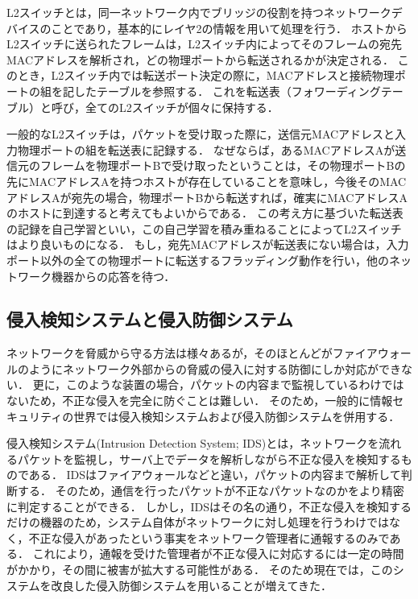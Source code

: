 L2スイッチとは，同一ネットワーク内でブリッジの役割を持つネットワークデバイスのことであり，基本的にレイヤ2の情報を用いて処理を行う\cite{masteringtcpip}．
ホストからL2スイッチに送られたフレームは，L2スイッチ内によってそのフレームの宛先MACアドレスを解析され，どの物理ポートから転送されるかが決定される．
このとき，L2スイッチ内では転送ポート決定の際に，MACアドレスと接続物理ポートの組を記したテーブルを参照する．
これを転送表（フォワーディングテーブル）と呼び，全てのL2スイッチが個々に保持する．

一般的なL2スイッチは，パケットを受け取った際に，送信元MACアドレスと入力物理ポートの組を転送表に記録する．
なぜならば，あるMACアドレスAが送信元のフレームを物理ポートBで受け取ったということは，その物理ポートBの先にMACアドレスAを持つホストが存在していることを意味し，今後そのMACアドレスAが宛先の場合，物理ポートBから転送すれば，確実にMACアドレスAのホストに到達すると考えてもよいからである．
この考え方に基づいた転送表の記録を自己学習といい，この自己学習を積み重ねることによってL2スイッチはより良いものになる．
もし，宛先MACアドレスが転送表にない場合は，入力ポート以外の全ての物理ポートに転送するフラッディング動作を行い，他のネットワーク機器からの応答を待つ．

\subsection{侵入検知システムと侵入防御システム}

ネットワークを脅威から守る方法は様々あるが，そのほとんどがファイアウォールのようにネットワーク外部からの脅威の侵入に対する防御にしか対応ができない．
更に，このような装置の場合，パケットの内容まで監視しているわけではないため，不正な侵入を完全に防ぐことは難しい．
そのため，一般的に情報セキュリティの世界では侵入検知システムおよび侵入防御システムを併用する．

侵入検知システム(Intrusion Detection System; IDS)とは，ネットワークを流れるパケットを監視し，サーバ上でデータを解析しながら不正な侵入を検知するものである\cite{idsandips}．
IDSはファイアウォールなどと違い，パケットの内容まで解析して判断する．
そのため，通信を行ったパケットが不正なパケットなのかをより精密に判定することができる．
しかし，IDSはその名の通り，不正な侵入を検知するだけの機器のため，システム自体がネットワークに対し処理を行うわけではなく，不正な侵入があったという事実をネットワーク管理者に通報するのみである．
これにより，通報を受けた管理者が不正な侵入に対応するには一定の時間がかかり，その間に被害が拡大する可能性がある．
そのため現在では，このシステムを改良した侵入防御システムを用いることが増えてきた．

